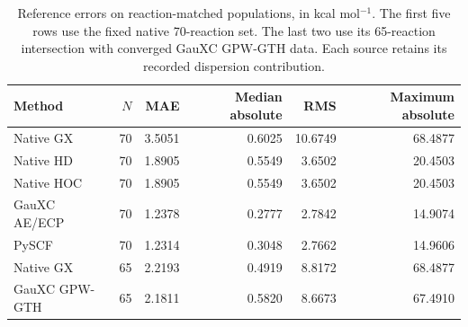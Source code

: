 \begin{table}[htbp]
\centering\small
\caption{Reference errors on reaction-matched populations, in kcal mol$^{-1}$. The first five rows use the fixed native 70-reaction set. The last two use its 65-reaction intersection with converged GauXC GPW-GTH data. Each source retains its recorded dispersion contribution.}\label{tab:interface-summary}
\begin{tabular}{lrrrrr}
\toprule
Method & $N$ & MAE & Median absolute & RMS & Maximum absolute\\
\midrule
Native GX & 70 & 3.5051 & 0.6025 & 10.6749 & 68.4877 \\
Native HD & 70 & 1.8905 & 0.5549 & 3.6502 & 20.4503 \\
Native HOC & 70 & 1.8905 & 0.5549 & 3.6502 & 20.4503 \\
GauXC AE/ECP & 70 & 1.2378 & 0.2777 & 2.7842 & 14.9074 \\
PySCF & 70 & 1.2314 & 0.3048 & 2.7662 & 14.9606 \\
Native GX & 65 & 2.2193 & 0.4919 & 8.8172 & 68.4877 \\
GauXC GPW-GTH & 65 & 2.1811 & 0.5820 & 8.6673 & 67.4910 \\
\bottomrule
\end{tabular}
\end{table}
